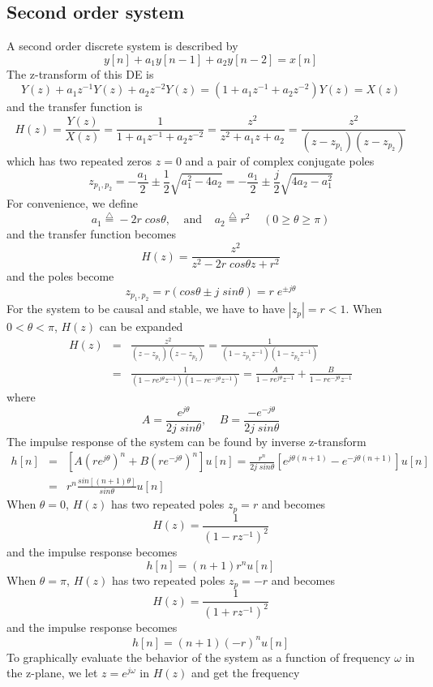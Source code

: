 \newpage
\subsection*{Second order system}

A second order discrete system is described by
\[	y[n]+a_1y[n-1]+a_2y[n-2]=x[n]	\]
The z-transform of this DE is
\[	Y(z)+a_1z^{-1}Y(z)+a_2z^{-2}Y(z)=(1+a_1z^{-1}+a_2z^{-2})Y(z)=X(z)	\]
and the transfer function is
\[	H(z)=\frac{Y(z)}{X(z)}=\frac{1}{1+a_1z^{-1}+a_2z^{-2}}
	=\frac{z^2}{z^2+a_1z+a_2}=\frac{z^2}{(z-z_{p_1})(z-z_{p_2})}
\]
which has two repeated zeros $z=0$ and a pair of complex conjugate poles
\[	z_{p_1,p_2}=-\frac{a_1}{2}\pm\frac{1}{2}\sqrt{a_1^2-4a_2}
		=-\frac{a_1}{2}\pm\frac{j}{2}\sqrt{4a_2-a_1^2}	\]
For convenience, we define
\[	a_1\stackrel{\triangle}{=}-2r\;cos\theta, \;\;\;\;\mbox{and}
\;\;\;\; a_2\stackrel{\triangle}{=}r^2\;\;\;\;(0\ge \theta \ge \pi) \]
and the transfer function becomes
\[	H(z)=\frac{z^2}{z^2-2r\;cos\theta z+r^2}	\]
and the poles become
\[
z_{p_1,p_2}=r(cos\theta \pm j\;sin\theta)=r\;e^{\pm j\theta}	\]
For the system to be causal and stable, we have to have $|z_p|=r<1$. 
When $0<\theta <\pi$, $H(z)$ can be expanded 
\begin{eqnarray}
 H(z) &=& \frac{z^2}{(z-z_{p_1})(z-z_{p_2})}=
	\frac{1}{(1-z_{p_1}z^{-1})(1-z_{p_2}z^{-1})}
	\nonumber \\
 &=& \frac{1}{(1-r e^{j\theta}z^{-1})(1-r e^{-j\theta}z^{-1})} 
 = \frac{A}{1-r e^{j\theta}z^{-1}}+\frac{B}{1-r e^{-j\theta}z^{-1}}	
	\nonumber
\end{eqnarray}
where
\[
A=\frac{e^{j\theta}}{2j\;sin\theta},\;\;\;\;B=\frac{-e^{-j\theta}}{2j\;sin\theta}
\]
The impulse response of the system can be found by inverse z-transform 
\begin{eqnarray}
h[n]&=& [A(re^{j\theta})^n+B(re^{-j\theta})^n]u[n]
	=\frac{r^n}{2j\;sin\theta}[e^{j\theta(n+1)}-e^{-j\theta(n+1)}]u[n]
	\nonumber \\
 &=& r^n\frac{sin[(n+1)\theta]}{sin\theta}u[n]
	\nonumber 
\end{eqnarray}
When $\theta=0$, $H(z)$ has two repeated poles $z_p=r$ and becomes
\[ H(z)=\frac{1}{(1-rz^{-1})^2}	\]
and the impulse response becomes
\[	h[n]=(n+1)r^n u[n]	\]
When $\theta=\pi$, $H(z)$ has two repeated poles $z_p=-r$ and becomes
\[ H(z)=\frac{1}{(1+rz^{-1})^2}	\]
and the impulse response becomes
\[	h[n]=(n+1)(-r)^n u[n]	\]
To graphically evaluate the behavior of the system as a function of frequency 
$\omega$ in the z-plane, we let $z=e^{j\omega}$ in $H(z)$ and get the frequency 

